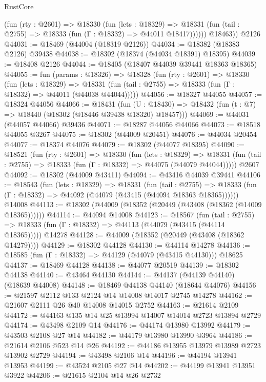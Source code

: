 \begin{lexlean}{RustCore}
\begin{coremodule}
            (fun (rty : @2601) =>
            @18330
              (fun (lets : @18329) =>
              @18331 (fun (tail : @2755) => @18333 (fun (Γ : @18332) => @44011 @18417))))))
        @18463))
    @2126
@44031 := @18469 (@44004 (@18319 @2126))
@44034 := @18382 (@18383 @2126) @39438
@44038 := @18302 (@18374 (@44034 @18391) @18395)
@44039 := @18408 @2126
@44044 := @18405 (@18407 @44039 @39441 @18363 @18365)
@44055 := fun (params : @18326) =>
  @18328
    (fun (rty : @2601) =>
    @18330
      (fun (lets : @18329) =>
      @18331 (fun (tail : @2755) => @18333 (fun (Γ : @18332) => @44011 (@44038 @44044)))))
@44056 := @18327 @44055
@44057 := @18324 @44056
@44066 := @18431
    (fun (U : @18430) => @18432 (fun (t : @7) => @18440 (@18302 (@18446 @39438 @18320) @18457)))
@44069 := @44031 (@44057 @44066) @39436
@44071 := @18287 @44056 @44066
@44073 := @18518 @44055 @3267
@44075 := @18302 (@44009 @20451)
@44076 := @44034 @20454
@44077 := @18374 @44076
@44079 := @18302 (@44077 @18395)
@44090 := @18521
    (fun (rty : @2601) =>
    @18330
      (fun (lets : @18329) =>
      @18331 (fun (tail : @2755) => @18333 (fun (Γ : @18332) => @44075 (@44079 @44044)))))
    @2607
@44092 := @18302 (@44009 @43411)
@44094 := @43416 @44039 @39441
@44106 := @18543
    (fun (lets : @18329) =>
    @18331
      (fun (tail : @2755) =>
      @18333 (fun (Γ : @18332) => @44092 (@44079 (@43415 (@44094 @18363 @18365))))))
    @14008
@44113 := @18302 (@44009 (@18352 (@20449 (@43408 (@18362 (@14009 @18365))))))
@44114 := @44094 @14008
@44123 := @18567
    (fun (tail : @2755) => @18333 (fun (Γ : @18332) => @44113 (@44079 (@43415 (@44114 @18365)))))
    @14278
@44128 := @44009 (@18352 (@20449 (@43408 (@18362 @14279))))
@44129 := @18302 @44128
@44130 := @44114 @14278
@44136 := @18585 (fun (Γ : @18332) => @44129 (@44079 (@43415 @44130))) @18625
@44137 := @18469 @44128
@44138 := @44077 @20519
@44139 := @18302 @44138
@44140 := @43464 @44130
@44144 := @44137 (@44139 @44140) (@18639 @44008)
@44148 := @18469 @44138 @44140 (@18644 @44076)
@44156 := @21597 @2112 @133 @2124 @14 @14008 @14017 @2745 @14278
@44162 := @21607 @2111 @26 @40 @14008 @14015 @2752
@44163 := @21614 @2109
@44172 := @44163 @135 @14 @25 @13994 @14007 @14014 @2723 @13894 @2729
@44174 := @43498 @2109 @14
@44176 := @44174 @13980 @13992
@44179 := @43503 @2108 @27 @14
@44182 := @44179 @13980 @13990 @3964
@44186 := @21614 @2106 @523 @14 @26
@44192 := @44186 @13955 @13979 @13989 @2723 @13902 @2729
@44194 := @43498 @2106 @14
@44196 := @44194 @13941 @13953
@44199 := @43524 @2105 @27 @14
@44202 := @44199 @13941 @13951 @3922
@44206 := @21615 @2104 @14 @26 @2732

\end{coremodule}
\end{lexlean}
